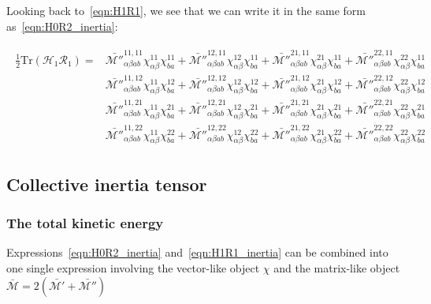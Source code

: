 Looking back to~\eqref{eqn:H1R1}, we see that we can write it in the same form as~\eqref{eqn:H0R2_inertia}:

\begin{tcolorbox}
	\begin{align}\label{eqn:H1R1_inertia}
	\begin{aligned}
	\frac{1}{2}\mathrm{Tr}\left(\mathcal{H}_1\mathcal{R}_1\right) = &
	\mathcal{\bar{M''}}^{11,11}_{\alpha\beta ab}\chi^{11}_{\alpha\beta}\chi^{11}_{ba} +
	\mathcal{\bar{M''}}^{12,11}_{\alpha\beta ab}\chi^{12}_{\alpha\beta}\chi^{11}_{ba} +
	\mathcal{\bar{M''}}^{21,11}_{\alpha\beta ab}\chi^{21}_{\alpha\beta}\chi^{11}_{ba} +
	\mathcal{\bar{M''}}^{22,11}_{\alpha\beta ab}\chi^{22}_{\alpha\beta}\chi^{11}_{ba} \\
	&
	\mathcal{\bar{M''}}^{11,12}_{\alpha\beta ab}\chi^{11}_{\alpha\beta}\chi^{12}_{ba} +
	\mathcal{\bar{M''}}^{12,12}_{\alpha\beta ab}\chi^{12}_{\alpha\beta}\chi^{12}_{ba} +
	\mathcal{\bar{M''}}^{21,12}_{\alpha\beta ab}\chi^{21}_{\alpha\beta}\chi^{12}_{ba} +
	\mathcal{\bar{M''}}^{22,12}_{\alpha\beta ab}\chi^{22}_{\alpha\beta}\chi^{12}_{ba} \\
	&
	\mathcal{\bar{M''}}^{11,21}_{\alpha\beta ab}\chi^{11}_{\alpha\beta}\chi^{21}_{ba} +
	\mathcal{\bar{M''}}^{12,21}_{\alpha\beta ab}\chi^{12}_{\alpha\beta}\chi^{21}_{ba} +
	\mathcal{\bar{M''}}^{21,21}_{\alpha\beta ab}\chi^{21}_{\alpha\beta}\chi^{21}_{ba} +
	\mathcal{\bar{M''}}^{22,21}_{\alpha\beta ab}\chi^{22}_{\alpha\beta}\chi^{21}_{ba} \\
	&
	\mathcal{\bar{M''}}^{11,22}_{\alpha\beta ab}\chi^{11}_{\alpha\beta}\chi^{22}_{ba} +
	\mathcal{\bar{M''}}^{12,22}_{\alpha\beta ab}\chi^{12}_{\alpha\beta}\chi^{22}_{ba} +
	\mathcal{\bar{M''}}^{21,22}_{\alpha\beta ab}\chi^{21}_{\alpha\beta}\chi^{22}_{ba} +
	\mathcal{\bar{M''}}^{22,22}_{\alpha\beta ab}\chi^{22}_{\alpha\beta}\chi^{22}_{ba}
	\end{aligned}
	\end{align}
\end{tcolorbox}


\subsection{Collective inertia tensor}

\subsubsection{The total kinetic energy}

Expressions~\eqref{eqn:H0R2_inertia} and~\eqref{eqn:H1R1_inertia} can be combined into one single expression involving the vector-like object $\chi$ and the matrix-like object $\mathcal{\bar{M}}=2(\mathcal{\bar{M'}+\bar{M''}})$


